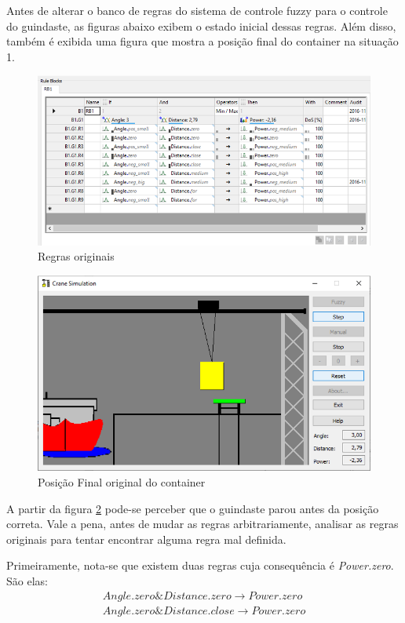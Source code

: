 \documentclass[12pt]{article}
\begin{document}
Antes de alterar o banco de regras do sistema de controle fuzzy para o controle do guindaste, as figuras abaixo exibem o estado inicial dessas regras. Além disso, também é exibida uma figura que mostra a posição final do container na situação 1.
\begin{figure}[H]
	\centering
	\includegraphics[width=0.9\linewidth]{Imagens/QR1/regrasOriginais}
	\caption{Regras originais}
	\label{fig:regrasoriginais}
\end{figure}
\begin{figure}[H]
	\centering
	\includegraphics[width=0.9\linewidth]{Imagens/QR1/posicaoFinalOriginal}
	\caption{Posição Final original do container}
	\label{fig:posicaoFinalOriginal}
\end{figure}

A partir da figura \ref{fig:posicaoFinalOriginal} pode-se perceber que o guindaste parou antes da posição correta. Vale a pena, antes de mudar as regras arbitrariamente,  analisar as regras originais para tentar encontrar alguma regra mal definida.

Primeiramente, nota-se que existem duas regras cuja consequência é \textit{Power.zero}. São elas:
\begin{align*}
	Angle.zero\&Distance.zero\to Power.zero\\
	Angle.zero\&Distance.close\to Power.zero
\end{align*}
\end{document}
